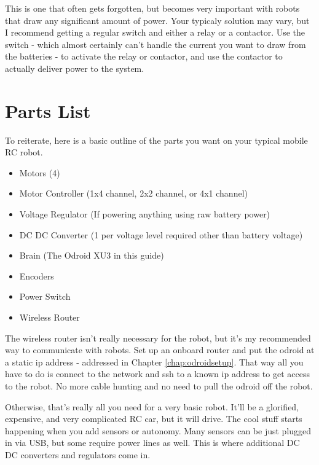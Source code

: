 This is one that often gets forgotten, but becomes very important with robots that draw any significant amount of power. Your typicaly solution may vary, but I recommend getting a regular switch and either a relay or a contactor. Use the switch - which almost certainly can't handle the current you want to draw from the batteries - to activate the relay or contactor, and use the contactor to actually deliver power to the system.

\section{Parts List}

To reiterate, here is a basic outline of the parts you want on your typical mobile RC robot.

\begin{itemize}
  \item{Motors (4)}
  \item{Motor Controller (1x4 channel, 2x2 channel, or 4x1 channel)}
  \item{Voltage Regulator (If powering anything using raw battery power)}
  \item{DC DC Converter (1 per voltage level required other than battery voltage)}
  \item{Brain (The Odroid XU3 in this guide)}
  \item{Encoders}
  \item{Power Switch}
  \item{Wireless Router}
\end{itemize}

The wireless router isn't really necessary for the robot, but it's my recommended way to communicate with robots. Set up an onboard router and put the odroid at a static ip address - addressed in Chapter \ref{chap:odroidsetup}. That way all you have to do is connect to the network and ssh to a known ip address to get access to the robot. No more cable hunting and no need to pull the odroid off the robot. 

Otherwise, that's really all you need for a very basic robot. It'll be a glorified, expensive, and very complicated RC car, but it will drive. The cool stuff starts happening when you add sensors or autonomy. Many sensors can be just plugged in via USB, but some require power lines as well. This is where additional DC DC converters and regulators come in.
